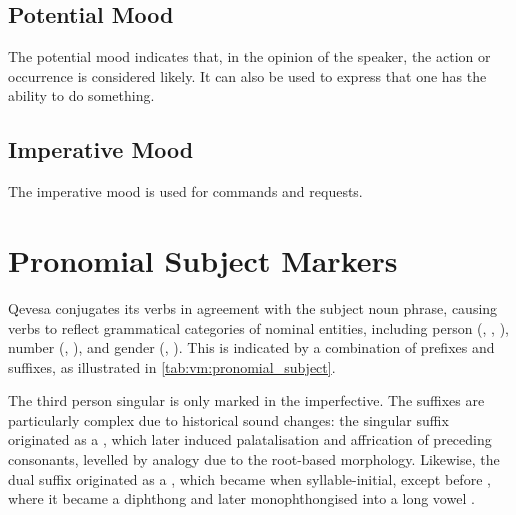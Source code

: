 \documentclass[grammar]{subfiles}
\begin{document}
\subsection{Potential Mood}
\label{ssec:vm:potential}

The potential mood indicates that, in the opinion of the speaker, the
action or occurrence is considered likely.  It can also be used to express that
one has the ability to do something.


\subsection{Imperative Mood}
\label{ssec:vm:imperative}

The imperative mood is used for commands and requests. 

\clearpage
\section{Pronomial Subject Markers}
\label{sec:vm:pronomial_markers}


Qevesa conjugates its verbs in agreement with the subject noun phrase, causing
verbs to reflect grammatical categories of nominal entities, including person
({\First}, {\Second}, {\Third}), number (\Sg, \Pl), and gender (\Anim, \Inan).
This is indicated by a combination of prefixes and suffixes, as illustrated in
\cref{tab:vm:pronomial_subject}.  

The third person singular is only marked in the imperfective.  The suffixes are particularly
complex due to historical sound changes: the singular suffix originated as a
, which later induced palatalisation and affrication of preceding
consonants, levelled by analogy due to the root-based morphology.  Likewise,
the dual suffix originated as a , which became  when
syllable-initial, except before , where it became a diphthong
 and later monophthongised into a long vowel .

\end{document}
